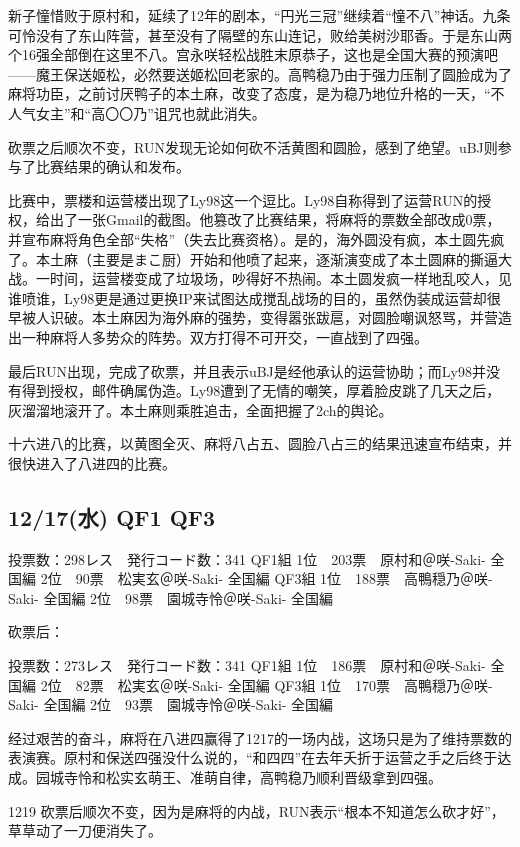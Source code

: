 新子憧惜败于原村和，延续了12年的剧本，“円光三冠”继续着“憧不八”神话。九条可怜没有了东山阵营，甚至没有了隔壁的东山连记，败给美树沙耶香。于是东山两个16强全部倒在这里不八。宫永咲轻松战胜末原恭子，这也是全国大赛的预演吧——魔王保送姬松，必然要送姬松回老家的。高鸭稳乃由于强力压制了圆脸成为了麻将功臣，之前讨厌鸭子的本土麻，改变了态度，是为稳乃地位升格的一天，“不人气女主”和“高〇〇乃”诅咒也就此消失。

砍票之后顺次不变，RUN发现无论如何砍不活黄图和圆脸，感到了绝望。uBJ则参与了比赛结果的确认和发布。

比赛中，票楼和运营楼出现了Ly98这一个逗比。Ly98自称得到了运营RUN的授权，给出了一张Gmail的截图。他篡改了比赛结果，将麻将的票数全部改成0票，并宣布麻将角色全部“失格”（失去比赛资格）。是的，海外圆没有疯，本土圆先疯了。本土麻（主要是まこ厨）开始和他喷了起来，逐渐演变成了本土圆麻的撕逼大战。一时间，运营楼变成了垃圾场，吵得好不热闹。本土圆发疯一样地乱咬人，见谁喷谁，Ly98更是通过更换IP来试图达成搅乱战场的目的，虽然伪装成运营却很早被人识破。本土麻因为海外麻的强势，变得嚣张跋扈，对圆脸嘲讽怒骂，并营造出一种麻将人多势众的阵势。双方打得不可开交，一直战到了四强。

最后RUN出现，完成了砍票，并且表示uBJ是经他承认的运营协助；而Ly98并没有得到授权，邮件确属伪造。Ly98遭到了无情的嘲笑，厚着脸皮跳了几天之后，灰溜溜地滚开了。本土麻则乘胜追击，全面把握了2ch的舆论。

十六进八的比赛，以黄图全灭、麻将八占五、圆脸八占三的结果迅速宣布结束，并很快进入了八进四的比赛。

\subsection{12/17(水) QF1 QF3}

	投票数：298レス　発行コード数：341
	QF1組
	1位　203票　原村和＠咲-Saki- 全国編
	2位　90票　松実玄＠咲-Saki- 全国編
	QF3組
	1位　188票　高鴨穏乃＠咲-Saki- 全国編
	2位　98票　園城寺怜＠咲-Saki- 全国編

砍票后：

	投票数：273レス　発行コード数：341
	QF1組
	1位　186票　原村和＠咲-Saki- 全国編
	2位　82票　松実玄＠咲-Saki- 全国編
	QF3組
	1位　170票　高鴨穏乃＠咲-Saki- 全国編
	2位　93票　園城寺怜＠咲-Saki- 全国編

经过艰苦的奋斗，麻将在八进四赢得了1217的一场内战，这场只是为了维持票数的表演赛。原村和保送四强没什么说的，“和四四”在去年夭折于运营之手之后终于达成。园城寺怜和松实玄萌王、准萌自律，高鸭稳乃顺利晋级拿到四强。

1219 砍票后顺次不变，因为是麻将的内战，RUN表示“根本不知道怎么砍才好”，草草动了一刀便消失了。

